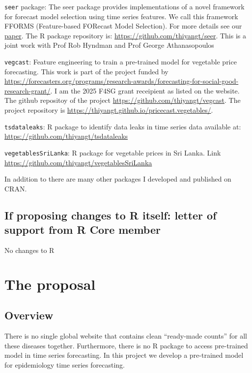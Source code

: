 \documentclass[
]{article}
\begin{document}
\texttt{seer} package: The seer package provides implementations of a
novel framework for forecast model selection using time series features.
We call this framework FFORMS (Feature-based FORecast Model Selection).
For more details see our
\href{https://onlinelibrary.wiley.com/doi/abs/10.1002/for.2963}{paper}.
The R package repository is: \url{https://github.com/thiyangt/seer}.
This is a joint work with Prof Rob Hyndman and Prof George
Athanasopoulos

\texttt{vegcast}: Feature engineering to train a pre-trained model for
vegetable price forecasting. This work is part of the project funded by
\url{https://forecasters.org/programs/research-awards/forecasting-for-social-good-research-grant/}.
I am the 2025 F4SG grant receipient as listed on the website. The github
repositoy of the project \url{https://github.com/thiyangt/vegcast}. The
project repository is
\url{https://thiyangt.github.io/pricecast.vegetables/}.

\texttt{tsdataleaks}: R package to identify data leaks in time series
data available at: \url{https://github.com/thiyangt/tsdataleaks}

\texttt{vegetablesSriLanka}: R package for vegetable prices in Sri
Lanka. Link \url{https://github.com/thiyangt/vegetablesSriLanka}

In addition to there are many other packages I developed and published
on CRAN.

\subsection{If proposing changes to R itself: letter of support from R
Core
member}\label{if-proposing-changes-to-r-itself-letter-of-support-from-r-core-member}

No changes to R

\section{The proposal}\label{the-proposal}

\subsection{Overview}\label{overview}

There is no single global website that contains clean ``ready-made
counts'' for all these diseases together. Furthermore, there is no R
package to access pre-trained model in time series forecasting. In this
project we develop a pre-trained model for epidemiology time series
forecasting.
\end{document}

